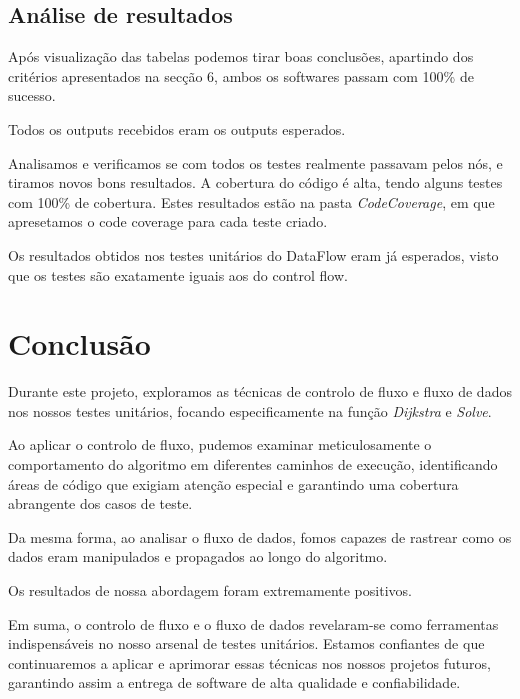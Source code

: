 \documentclass{article}
\begin{document}
\subsection{Análise de resultados}
\texttt{}\par Após visualização das tabelas podemos tirar boas conclusões, apartindo dos critérios apresentados na secção 6, ambos os softwares passam com 100\% de sucesso.

Todos os outputs recebidos eram os outputs esperados.

Analisamos e verificamos se com todos os testes realmente passavam pelos nós, e tiramos novos bons resultados. A cobertura do código é alta, tendo alguns testes com 100\% de cobertura. Estes resultados estão na pasta \textit{CodeCoverage}, em que apresetamos o code coverage para cada teste criado.

Os resultados obtidos nos testes unitários do DataFlow eram já esperados, visto que os testes são exatamente iguais aos do control flow.

\section{Conclusão}
\texttt{}\par Durante este projeto, exploramos as técnicas de controlo de fluxo e fluxo de dados nos nossos testes unitários, focando especificamente na função \textit{Dijkstra} e \textit{Solve}. 

Ao aplicar o controlo de fluxo, pudemos examinar meticulosamente o comportamento do algoritmo em diferentes caminhos de execução, identificando áreas de código que exigiam atenção especial e garantindo uma cobertura abrangente dos casos de teste.

Da mesma forma, ao analisar o fluxo de dados, fomos capazes de rastrear como os dados eram manipulados e propagados ao longo do algoritmo.

Os resultados de nossa abordagem foram extremamente positivos.

Em suma, o controlo de fluxo e o fluxo de dados revelaram-se como ferramentas indispensáveis no nosso arsenal de testes unitários. Estamos confiantes de que continuaremos a aplicar e aprimorar essas técnicas nos nossos projetos futuros, garantindo assim a entrega de software de alta qualidade e confiabilidade.
\end{document}
